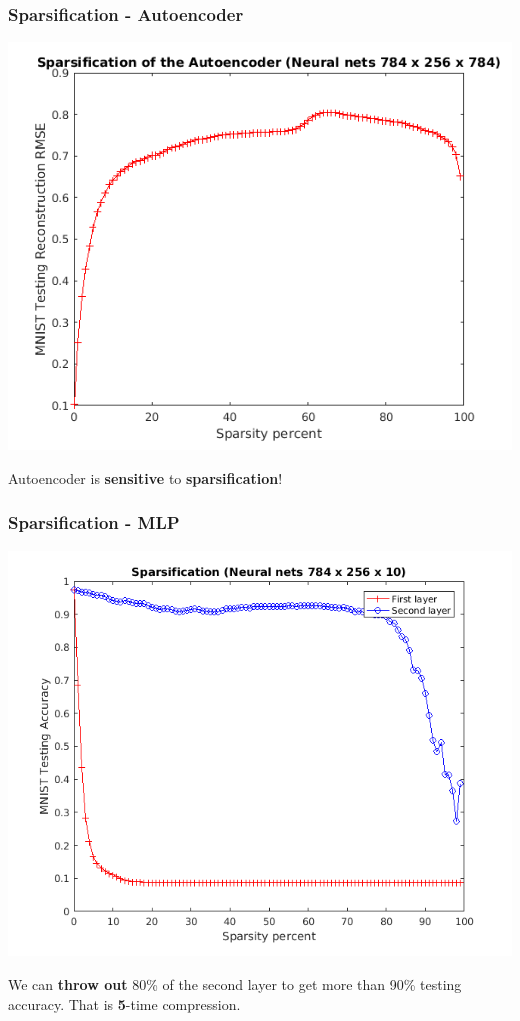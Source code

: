 \documentclass[7pt]{beamer}
\begin{document}
\begin{sloppypar}
\begin{frame}
\frametitle{Sparsification - Autoencoder}
\begin{justify}
\begin{center}
	\includegraphics[scale=0.4]{Sparse-Autoencoder}
\end{center}
\end{justify}
Autoencoder is \textbf{sensitive} to \textbf{sparsification}!
\end{frame}


\begin{frame}
\frametitle{Sparsification - MLP}
\begin{justify}
\begin{center}
	\includegraphics[scale=0.4]{Sparse-Neural-nets}
\end{center}
We can \textbf{throw out} 80\% of the second layer to get more than 90\% testing accuracy. That is \textbf{5}-time compression.
\end{justify}
\end{frame}


\end{sloppypar}
\end{document}
